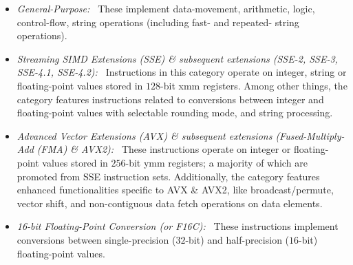 \begin{itemize}
\item \emph{General-Purpose:~}
These implement data-movement, arithmetic, logic, control-flow, string operations (including fast- and repeated- string operations).
    
\item \emph{Streaming SIMD Extensions (SSE) \& subsequent extensions (SSE-2, 
SSE-3, SSE-4.1, SSE-4.2):~}
Instructions in this category operate on integer, string or floating-point values stored in $128$-bit xmm registers. Among other things, the category features instructions related to conversions between integer and floating-point values with selectable rounding mode, and string processing.
    
\item \emph{Advanced Vector Extensions (AVX) \& subsequent extensions 
(Fused-Multiply-Add (FMA) \& AVX2):~}
These instructions operate on integer or floating-point values stored in $256$-bit ymm registers; a majority of which are promoted from SSE instruction sets. Additionally, the category features enhanced functionalities specific to AVX \& AVX2, like  broadcast/permute, vector shift, and non-contiguous data fetch operations on data elements. 

\item \emph{16-bit Floating-Point Conversion (or F16C):~}
These instructions implement conversions between single-precision ($32$-bit) and half-precision ($16$-bit) floating-point values. 
\end{itemize}

